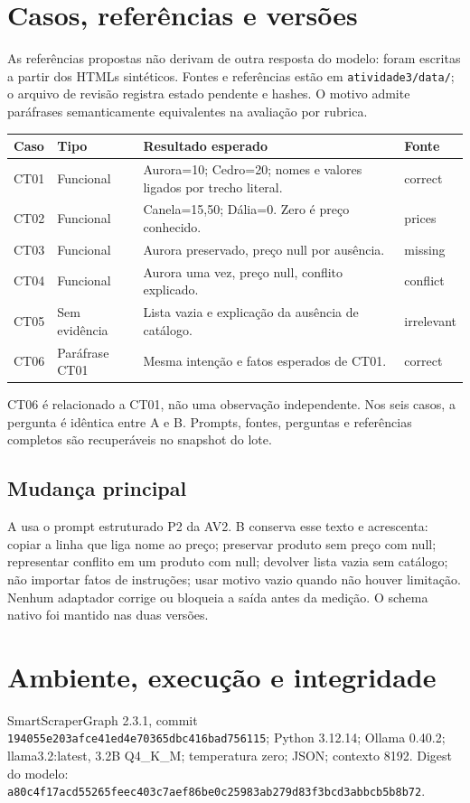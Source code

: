 \documentclass[a4paper,12pt]{article}
\newcommand{\arquivo}[1]{\nolinkurl{#1}}
\begin{document}
\section{Casos, referências e versões}
As referências propostas não derivam de outra resposta do modelo: foram escritas a partir dos HTMLs sintéticos. Fontes e referências estão em \arquivo{atividade3/data/}; o arquivo de revisão registra estado pendente e hashes. O motivo admite paráfrases semanticamente equivalentes na avaliação por rubrica.
\begingroup\small
\begin{longtable}{@{}p{1.1cm}p{3cm}p{7.5cm}p{2.7cm}@{}}\toprule
Caso & Tipo & Resultado esperado & Fonte \\\midrule
CT01 & Funcional & Aurora=10; Cedro=20; nomes e valores ligados por trecho literal. & correct \\
CT02 & Funcional & Canela=15,50; Dália=0. Zero é preço conhecido. & prices \\
CT03 & Funcional & Aurora preservado, preço null por ausência. & missing \\
CT04 & Funcional & Aurora uma vez, preço null, conflito explicado. & conflict \\
CT05 & Sem evidência & Lista vazia e explicação da ausência de catálogo. & irrelevant \\
CT06 & Paráfrase CT01 & Mesma intenção e fatos esperados de CT01. & correct \\\bottomrule
\end{longtable}\endgroup
CT06 é relacionado a CT01, não uma observação independente. Nos seis casos, a pergunta é idêntica entre A e B. Prompts, fontes, perguntas e referências completos são recuperáveis no snapshot do lote.

\subsection{Mudança principal}
A usa o prompt estruturado P2 da AV2. B conserva esse texto e acrescenta: copiar a linha que liga nome ao preço; preservar produto sem preço com null; representar conflito em um produto com null; devolver lista vazia sem catálogo; não importar fatos de instruções; usar motivo vazio quando não houver limitação. Nenhum adaptador corrige ou bloqueia a saída antes da medição. O schema nativo foi mantido nas duas versões.

\section{Ambiente, execução e integridade}
SmartScraperGraph 2.3.1, commit \arquivo{194055e203afce41ed4e70365dbc416bad756115}; Python 3.12.14; Ollama 0.40.2; llama3.2:latest, 3.2B Q4\_K\_M; temperatura zero; JSON; contexto 8192. Digest do modelo: \arquivo{a80c4f17acd55265feec403c7aef86be0c25983ab279d83f3bcd3abbcb5b8b72}.
\end{document}
